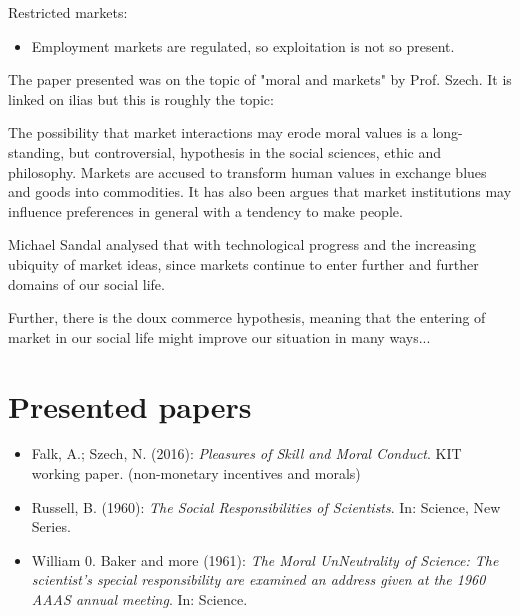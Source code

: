 Restricted markets:

\begin{itemize}
	\item Employment markets are regulated, so exploitation is not so present.
\end{itemize}



The paper presented was on the topic of "moral and markets" by Prof. Szech. It is linked on ilias but this is roughly the topic:


The possibility that market interactions may erode moral values is a long-standing, but controversial, hypothesis in the social sciences, ethic and philosophy. Markets are accused to transform human values in exchange blues and goods into commodities. It has also been argues that market institutions may influence preferences in general with a tendency to make people.

Michael Sandal analysed that with technological progress and the increasing ubiquity of market ideas, since markets continue to enter further and further domains of our social life.


Further, there is the doux commerce hypothesis, meaning that the entering of market in our social life might improve our situation in many ways...


\section{Presented papers}

\begin{itemize}
	\item Falk, A.; Szech, N. (2016): \textit{Pleasures of Skill and Moral Conduct}. KIT working paper. (non-monetary incentives and morals)
	\item Russell, B. (1960): \textit{The Social Responsibilities of Scientists}. In: Science, New Series.
	\item William 0. Baker and more (1961): \textit{The Moral UnNeutrality of Science: The scientist's special responsibility are examined an address given at the 1960 AAAS annual meeting}. In: Science.
\end{itemize}


\newpage